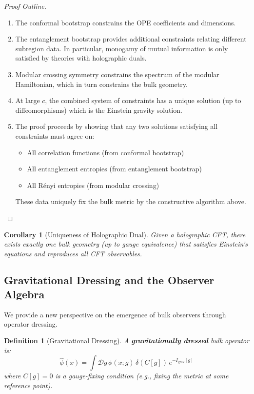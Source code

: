 \documentclass[12pt,a4paper]{article}
\newtheorem{definition}[theorem]{Definition}
\newtheorem{corollary}[theorem]{Corollary}
\begin{document}
\begin{proof}[Proof Outline]
\begin{enumerate}
    \item The conformal bootstrap constrains the OPE coefficients and dimensions.
    
    \item The entanglement bootstrap provides additional constraints relating different subregion data. In particular, monogamy of mutual information is only satisfied by theories with holographic duals.
    
    \item Modular crossing symmetry constrains the spectrum of the modular Hamiltonian, which in turn constrains the bulk geometry.
    
    \item At large $c$, the combined system of constraints has a unique solution (up to diffeomorphisms) which is the Einstein gravity solution.
    
    \item The proof proceeds by showing that any two solutions satisfying all constraints must agree on:
    \begin{itemize}
        \item All correlation functions (from conformal bootstrap)
        \item All entanglement entropies (from entanglement bootstrap)
        \item All R\'enyi entropies (from modular crossing)
    \end{itemize}
    These data uniquely fix the bulk metric by the constructive algorithm above.
\end{enumerate}
\end{proof}

\begin{corollary}[Uniqueness of Holographic Dual]
Given a holographic CFT, there exists exactly one bulk geometry (up to gauge equivalence) that satisfies Einstein's equations and reproduces all CFT observables.
\end{corollary}

\subsection{Gravitational Dressing and the Observer Algebra}

We provide a new perspective on the emergence of bulk observers through operator dressing.

\begin{definition}[Gravitational Dressing]
A \textbf{gravitationally dressed} bulk operator is:
\begin{equation}
\hat{\phi}(x) = \int \mathcal{D}g \, \phi(x; g) \, \delta(C[g]) \, e^{-I_{\text{grav}}[g]}
\end{equation}
where $C[g] = 0$ is a gauge-fixing condition (e.g., fixing the metric at some reference point).
\end{definition}
\end{document}
